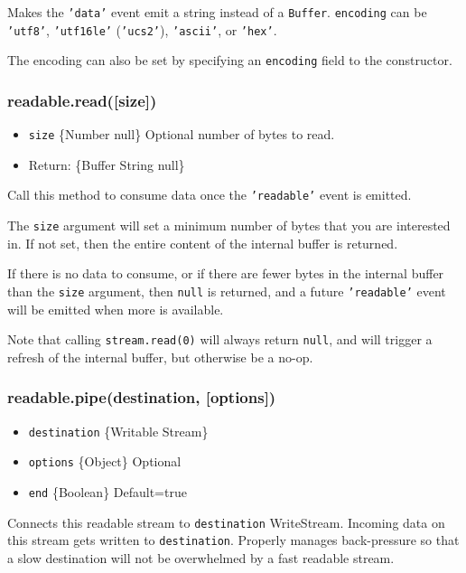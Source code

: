 Makes the \texttt{'data'} event emit a string instead of a
\texttt{Buffer}. \texttt{encoding} can be \texttt{'utf8'},
\texttt{'utf16le'} (\texttt{'ucs2'}), \texttt{'ascii'}, or
\texttt{'hex'}.

The encoding can also be set by specifying an \texttt{encoding} field to
the constructor.

\subsubsection{readable.read({[}size{]})}

\begin{itemize}
\item
  \texttt{size} \{Number \textbar{} null\} Optional number of bytes to
  read.
\item
  Return: \{Buffer \textbar{} String \textbar{} null\}
\end{itemize}

Call this method to consume data once the \texttt{'readable'} event is
emitted.

The \texttt{size} argument will set a minimum number of bytes that you
are interested in. If not set, then the entire content of the internal
buffer is returned.

If there is no data to consume, or if there are fewer bytes in the
internal buffer than the \texttt{size} argument, then \texttt{null} is
returned, and a future \texttt{'readable'} event will be emitted when
more is available.

Note that calling \texttt{stream.read(0)} will always return
\texttt{null}, and will trigger a refresh of the internal buffer, but
otherwise be a no-op.

\subsubsection{readable.pipe(destination, {[}options{]})}

\begin{itemize}
\item
  \texttt{destination} \{Writable Stream\}
\item
  \texttt{options} \{Object\} Optional
\item
  \texttt{end} \{Boolean\} Default=true
\end{itemize}

Connects this readable stream to \texttt{destination} WriteStream.
Incoming data on this stream gets written to \texttt{destination}.
Properly manages back-pressure so that a slow destination will not be
overwhelmed by a fast readable stream.

